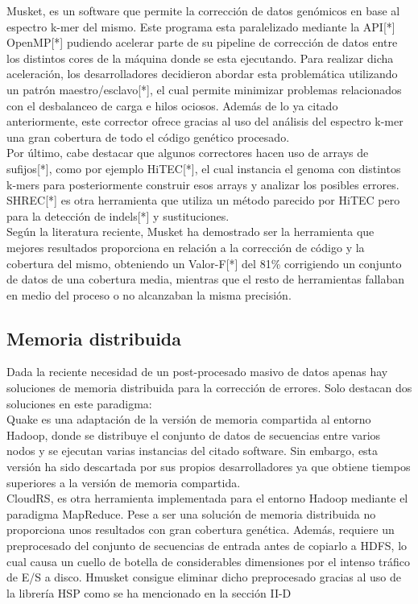\documentclass[conference]{IEEEtran}
\begin{document}
Musket\cite{musket}, es un software que permite la corrección de datos genómicos en base al espectro k-mer del mismo. Este programa esta paralelizado mediante la API[*] OpenMP[*] pudiendo acelerar parte de su pipeline de corrección de datos entre los distintos cores de la máquina donde se esta ejecutando. Para realizar dicha aceleración, los desarrolladores decidieron abordar esta problemática utilizando un patrón maestro/esclavo[*], el cual permite minimizar problemas relacionados con el desbalanceo de carga e hilos ociosos. Además de lo ya citado anteriormente, este corrector ofrece gracias al uso del análisis del espectro k-mer una gran cobertura de todo el código genético procesado.\\


Por último, cabe destacar que algunos correctores hacen uso de arrays de sufijos[*], como por ejemplo HiTEC[*], el cual instancia el genoma con distintos k-mers para posteriormente construir esos arrays y analizar los posibles errores. SHREC[*] es otra herramienta que utiliza un método parecido por HiTEC pero para la detección de indels[*] y sustituciones.\\

Según la literatura reciente\cite{comparative}, Musket ha demostrado ser la herramienta que mejores resultados proporciona en relación a la corrección de código y la cobertura del mismo, obteniendo un Valor-F[*] del 81\% corrigiendo un conjunto de datos de una cobertura media, mientras que el resto de herramientas fallaban en medio del proceso o no alcanzaban la misma precisión.

\subsection{Memoria distribuida}
Dada la reciente necesidad de un post-procesado masivo de datos apenas hay soluciones de memoria distribuida para la corrección de errores. Solo destacan dos soluciones en este paradigma:\\

Quake es una adaptación de la versión de memoria compartida al entorno Hadoop, donde se distribuye el conjunto de datos de secuencias entre varios nodos y se ejecutan varias instancias del citado software. Sin embargo, esta versión ha sido descartada por sus propios desarrolladores ya que obtiene tiempos superiores a la versión de memoria compartida.\\

CloudRS\cite{cloudrs}, es otra herramienta implementada para el entorno Hadoop mediante el paradigma MapReduce. Pese a ser una solución de memoria distribuida no proporciona unos resultados con gran cobertura genética. Además, requiere un preprocesado del conjunto de secuencias de entrada antes de copiarlo a HDFS, lo cual causa un cuello de botella de considerables dimensiones por el intenso tráfico de E/S a disco. Hmusket consigue eliminar dicho preprocesado gracias al uso de la librería HSP\cite{hsp} como se ha mencionado en la sección II-D\\
\end{document}
